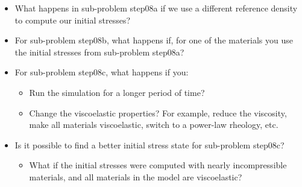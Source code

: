 \begin{itemize}
\item What happens in sub-problem step08a if we use a different
  reference density to compute our initial stresses?
\item For sub-problem step08b, what happens if, for one of the
  materials you use the initial stresses from sub-problem step08a?
\item For sub-problem step08c, what happens if you:
  \begin{itemize}
  \item Run the simulation for a longer period of time?
  \item Change the viscoelastic properties? For example, reduce the
    viscosity, make all materials viscoelastic, switch to a power-law
    rheology, etc.
  \end{itemize}
\item Is it possible to find a better initial stress state for
  sub-problem step08c?
  \begin{itemize}
  \item What if the initial stresses were computed with nearly
    incompressible materials, and all materials in the model are
    viscoelastic?
  \end{itemize}
\end{itemize}

